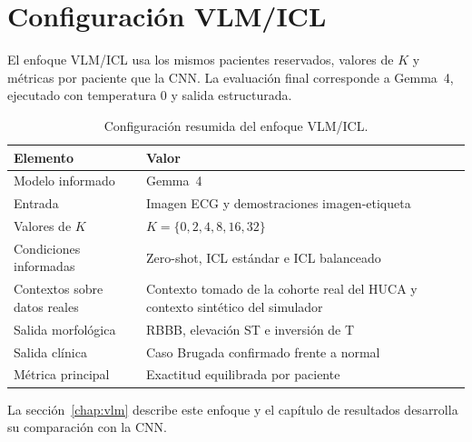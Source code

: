 \section{Configuración VLM/ICL}

El enfoque VLM/ICL usa los mismos pacientes reservados, valores de \(K\) y métricas por paciente que la CNN. La evaluación final corresponde a Gemma~4, ejecutado con temperatura 0 y salida estructurada.

\begin{table}[H]
  \centering
  \small
  \begin{tabularx}{0.94\textwidth}{p{4.4cm}X}
    \toprule
    Elemento & Valor \\
    \midrule
    Modelo informado & Gemma~4 \\
    Entrada & Imagen ECG y demostraciones imagen-etiqueta \\
    Valores de \(K\) & \(K=\{0,2,4,8,16,32\}\) \\
    Condiciones informadas & Zero-shot, ICL estándar e ICL balanceado \\
    Contextos sobre datos reales & Contexto tomado de la cohorte real del HUCA y contexto sintético del simulador \\
    Salida morfológica & RBBB, elevación ST e inversión de T \\
    Salida clínica & Caso Brugada confirmado frente a normal \\
    Métrica principal & Exactitud equilibrada por paciente \\
    \bottomrule
  \end{tabularx}
  \caption{Configuración resumida del enfoque VLM/ICL.}
  \label{tab:config_vlm_appendix}
\end{table}

La sección~\ref{chap:vlm} describe este enfoque y el capítulo de resultados desarrolla su comparación con la CNN.
